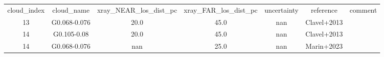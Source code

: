 \begin{table}
\begin{tabular}{ccccccc}
cloud_index & cloud_name & xray_NEAR_los_dist_pc & xray_FAR_los_dist_pc & uncertainty & reference & comment \\
13 & G0.068-0.076 & 20.0 & 45.0 & nan & Clavel+2013 &  \\
14 & G0.105-0.08 & 20.0 & 45.0 & nan & Clavel+2013 &  \\
14 & G0.068-0.076 & nan & 25.0 & nan & Marin+2023 &  \\
\end{tabular}
\end{table}
